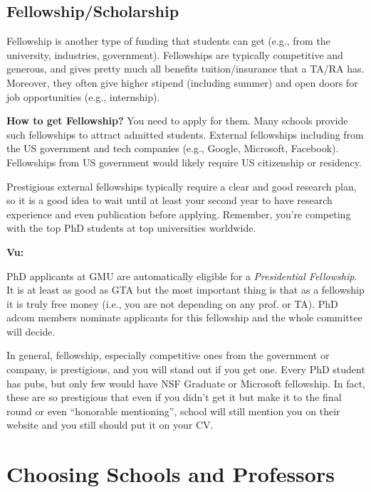 \documentclass[oneside,11pt]{memoir}
\newenvironment{commentbox}[1][]{
  \small
  \begin{mybox}
    {\small \textbf{#1}}
  }{
  \end{mybox}
}
\begin{document}
\section{Fellowship/Scholarship}

Fellowship is another type of funding that students can get (e.g., from the university, industries, government).
Fellowships are typically competitive and generous, and gives pretty much all benefits tuition/insurance that a TA/RA has.  Moreover, they often give higher stipend (including summer) and open doors for job opportunities (e.g., internship).


\textbf{How to get Fellowship?} You need to apply for them.  Many schools provide such fellowships to attract admitted students.
External fellowships including from the US government and tech companies (e.g., Google, Microsoft, Facebook).  Fellowships from US government would likely require US citizenship or residency. %

Prestigious external fellowships typically require a clear and good research plan, so it is a good idea to wait until at least your second year to have research experience and even publication before applying. Remember, you're competing with the top PhD students at top universities worldwide.


\begin{commentbox}[Vu:]
  PhD applicants at GMU are automatically eligible for a \emph{Presidential Fellowship}.  It is at least as good as GTA but the most important thing is that as a fellowship it is truly free money (i.e., you are not depending on any prof. or TA).  PhD adcom members nominate applicants for this fellowship and the whole committee will decide.
\end{commentbox}

In general, fellowship, especially competitive ones from the government or company, is prestigious, and you will stand out if you get one.  Every PhD student has pubs, but only few  would have NSF Graduate or Microsoft fellowship. In fact, these are so prestigious that even if you didn't get it but make it to the final round or even ``honorable mentioning'', school will still mention you on their website and you still should put it on your CV.


\chapter{Choosing Schools and Professors}\label{sec:schoolsandprofs}
\end{document}
